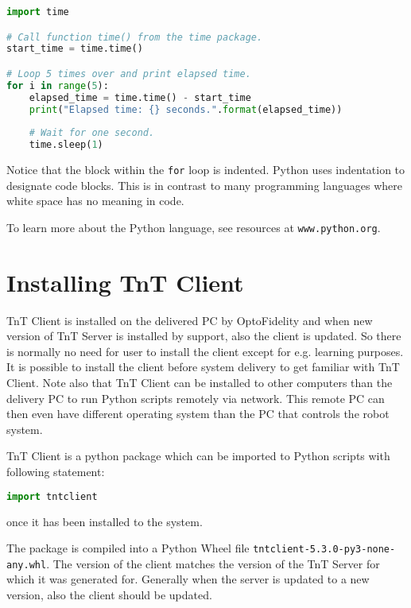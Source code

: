 \begin{lstlisting}[language=Python]
import time

# Call function time() from the time package.
start_time = time.time()

# Loop 5 times over and print elapsed time.
for i in range(5):
    elapsed_time = time.time() - start_time
    print("Elapsed time: {} seconds.".format(elapsed_time))
    
    # Wait for one second.
    time.sleep(1)
\end{lstlisting}

Notice that the block within the \texttt{for} loop is indented. Python uses indentation to designate code blocks. This is in contrast to many programming languages where white space has no meaning in code.

To learn more about the Python language, see resources at \texttt{www.python.org}.

\section{Installing TnT Client}

TnT Client is installed on the delivered PC by OptoFidelity and when new version of TnT Server is installed by support, also the client is updated. So there is normally no need for user to install the client except for e.g. learning purposes. It is possible to install the client before system delivery to get familiar with TnT Client. Note also that TnT Client can be installed to other computers than the delivery PC to run Python scripts remotely via network. This remote PC can then even have different operating system than the PC that controls the robot system.


TnT Client is a python package which can be imported to Python scripts with following statement:

\begin{lstlisting}[language=Python]
import tntclient
\end{lstlisting}

once it has been installed to the system.

The package is compiled into a Python Wheel file \texttt{tntclient-5.3.0-py3-none-any.whl}. The version of the client matches the version of the TnT Server for which it was generated for. Generally when the server is updated to a new version, also the client should be updated.

